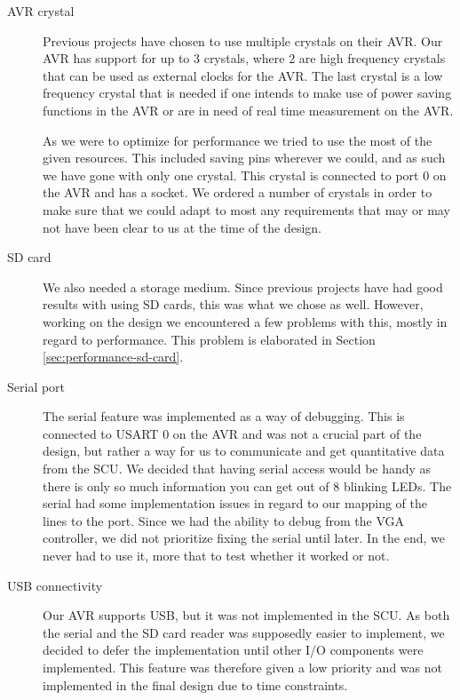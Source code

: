 \begin{description}

\item[AVR crystal] \hfill

Previous projects have chosen to use multiple crystals on their AVR. Our AVR has support for up to 3 crystals, where 2 are high frequency crystals that can be used as external clocks for the AVR. The last crystal is a low frequency crystal that is needed if one intends to make use of power saving functions in the AVR or are in need of real time measurement on the AVR. 

As we were to optimize for performance we tried to use the most of the given resources. This included saving pins wherever we could, and as such we have gone with only one crystal. This crystal is connected to port 0 on the AVR and has a socket. We ordered a number of crystals in order to make sure that we could adapt to most any requirements that may or may not have been clear to us at the time of the design.

\item[SD card]  \hfill %

We also needed a storage medium. Since previous projects have had good results with
using \ac{SD} cards, this was what we chose as well. However, working on the
design we encountered a few problems with this, mostly in
regard to performance. This problem is elaborated in Section
\ref{sec:performance-sd-card}.

\item[Serial port]  \hfill

The serial feature was implemented as a way of debugging. This is connected to
\ac{USART} 0 on the AVR and was not a crucial part of the design, but rather a
way for us to communicate and get quantitative data from the \ac{SCU}. We
decided that having serial access would be handy as there is only so much
information you can get out of 8 blinking \acp{LED}. The serial had some
implementation issues in regard to our mapping of the lines to the port. Since
we had the ability to debug from the \ac{VGA} controller, we did not prioritize
fixing the serial until later. In the end, we never had to use it, more that to
test whether it worked or not.

\item[USB connectivity]  \hfill 

Our AVR supports \ac{USB}, but it was not implemented in the \ac{SCU}. As both
the serial and the \ac{SD} card reader was supposedly easier to
implement\cite{berg2011festinalente}, we decided to defer the implementation
until other \ac{I/O} components were implemented. This feature was therefore
given a low priority and was not implemented in the final design due to time
constraints.
 

\end{description}
